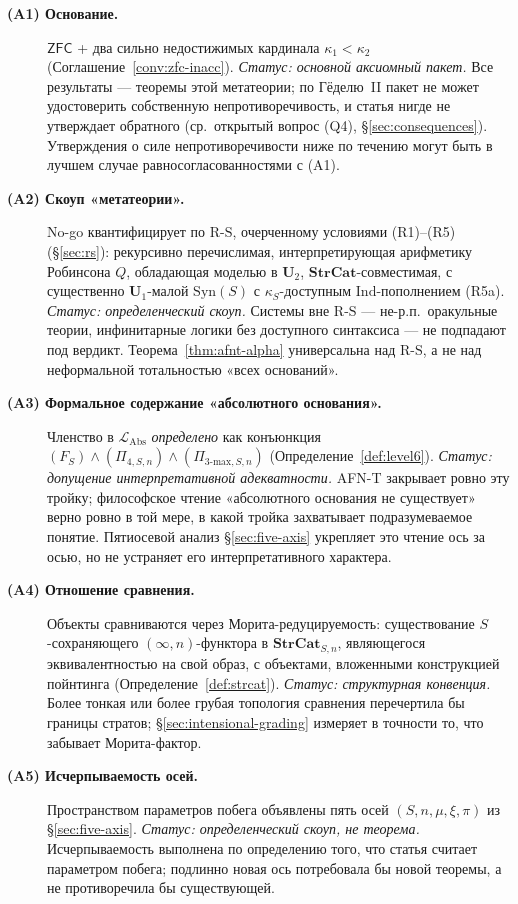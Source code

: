 \documentclass[11pt]{article}
\theoremstyle{plain}
\theoremstyle{definition}
\newcommand{\RS}{\mathrm{R\text{-}S}}
\newcommand{\LAbs}{\mathcal{L}_{\mathrm{Abs}}}
\newcommand{\Syn}{\mathrm{Syn}}
\newcommand{\ZFC}{\mathsf{ZFC}}
\begin{document}
\begin{description}
\item[\textbf{(A1) Основание.}] $\ZFC$ + два сильно недостижимых кардинала $\kappa_1 < \kappa_2$ (Соглашение~\ref{conv:zfc-inacc}). \emph{Статус: основной аксиомный пакет.} Все результаты — теоремы этой метатеории; по Гёделю~II пакет не может удостоверить собственную непротиворечивость, и статья нигде не утверждает обратного (ср.\ открытый вопрос (Q4), \S\ref{sec:consequences}). Утверждения о силе непротиворечивости ниже по течению могут быть в лучшем случае равносогласованностями с (A1).
\item[\textbf{(A2) Скоуп «метатеории».}] No-go квантифицирует по $\RS$, очерченному условиями (R1)--(R5) (\S\ref{sec:rs}): рекурсивно перечислимая, интерпретирующая арифметику Робинсона $Q$, обладающая моделью в $\mathbf{U}_2$, $\mathbf{StrCat}$-совместимая, с существенно $\mathbf{U}_1$-малой $\Syn(S)$ с $\kappa_S$-доступным $\mathrm{Ind}$-пополнением (R5a). \emph{Статус: определенческий скоуп.} Системы вне $\RS$ --- не-р.п.\ оракульные теории, инфинитарные логики без доступного синтаксиса --- не подпадают под вердикт. Теорема~\ref{thm:afnt-alpha} универсальна над $\RS$, а не над неформальной тотальностью «всех оснований».
\item[\textbf{(A3) Формальное содержание «абсолютного основания».}] Членство в $\LAbs$ \emph{определено} как конъюнкция $(F_S) \wedge (\Pi_{4, S, n}) \wedge (\Pi_{3\text{-max}, S, n})$ (Определение~\ref{def:level6}). \emph{Статус: допущение интерпретативной адекватности.} AFN-T закрывает ровно эту тройку; философское чтение «абсолютного основания не существует» верно ровно в той мере, в какой тройка захватывает подразумеваемое понятие. Пятиосевой анализ \S\ref{sec:five-axis} укрепляет это чтение ось за осью, но не устраняет его интерпретативного характера.
\item[\textbf{(A4) Отношение сравнения.}] Объекты сравниваются через Морита-редуцируемость: существование $S$-сохраняющего $(\infty, n)$-функтора в $\mathbf{StrCat}_{S, n}$, являющегося эквивалентностью на свой образ, с объектами, вложенными конструкцией пойнтинга (Определение~\ref{def:strcat}). \emph{Статус: структурная конвенция.} Более тонкая или более грубая топология сравнения перечертила бы границы стратов; \S\ref{sec:intensional-grading} измеряет в точности то, что забывает Морита-фактор.
\item[\textbf{(A5) Исчерпываемость осей.}] Пространством параметров побега объявлены пять осей $(S, n, \mu, \xi, \pi)$ из \S\ref{sec:five-axis}. \emph{Статус: определенческий скоуп, не теорема.} Исчерпываемость выполнена по определению того, что статья считает параметром побега; подлинно новая ось потребовала бы новой теоремы, а не противоречила бы существующей.

\end{description}
\end{document}
